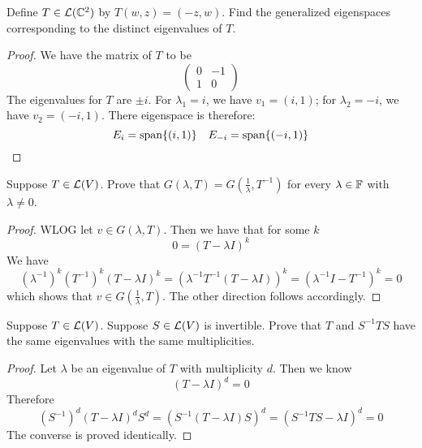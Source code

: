 \documentclass{extarticle}
\begin{document}

\newpage 
{}


\begin{problem}{1}
    Define \(T \in \mathcal{L}(\mathbb{C}^2)\) by \(T(w, z) = (-z, w)\). Find the generalized eigenspaces 
    corresponding to the distinct eigenvalues of \(T\).
\end{problem}

\begin{proof}
We have the matrix of \(T\) to be 
\[\begin{pmatrix}
    0 & -1 \\ 
    1 & 0
\end{pmatrix}\]
The eigenvalues for \(T\) are \(\pm i\). For \(\lambda_1 = i\), we have \(v_1 = (i, 1)\); for 
\(\lambda_2 = - i\), we have \(v_2 = (-i, 1)\). There eigenspace is therefore:
\[E_{i} = \text{span}\{(i, 1)\} \ \ \ E_{-i} = \text{span}\{(-i, 1)\}\]
\end{proof}

\begin{problem}{2}
    Suppose \(T \in \mathcal{L}(V)\). Prove that \(G(\lambda, T) = G(\frac{1}{\lambda}, T^{-1})\) for 
    every \(\lambda \in \mathbb{F}\) with \(\lambda \neq 0\). 
\end{problem}

\begin{proof}
WLOG let \(v \in G(\lambda, T)\). Then we have that for some \(k\)
\[0 = (T - \lambda I)^k\]
We have 
\[(\lambda^{-1})^k (T^{-1})^k (T - \lambda I)^k 
= (\lambda^{-1}T^{-1}(T - \lambda I))^k = (\lambda^{-1} I - T^{-1})^k = 0\]
which shows that \( v \in G(\frac{1}{\lambda}, T)\). The other direction follows accordingly. 
\end{proof}


\begin{problem}{3}
    Suppose \(T \in \mathcal{L}(V)\). Suppose \(S \in \mathcal{L}(V)\) is invertible. Prove that \(T\)
    and \(S^{-1}TS\) have the same eigenvalues with the same multiplicities.
\end{problem}

\begin{proof}
Let \(\lambda\) be an eigenvalue of \(T\) with multiplicity \(d\). Then we know 
\[(T - \lambda I)^d = 0\]
Therefore 
\[(S^{-1})^d (T - \lambda I)^d S^d = (S^{-1}(T - \lambda I) S)^d = (S^{-1}TS - \lambda I)^d = 0\]
The converse is proved identically. 
\end{proof}
\end{document}

